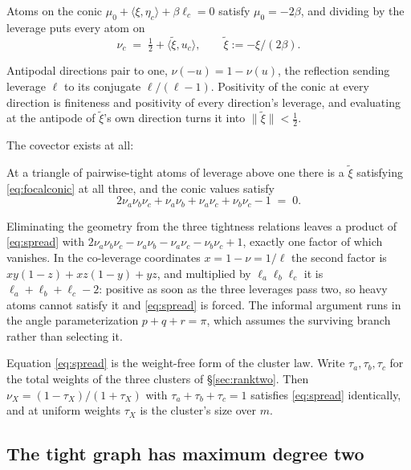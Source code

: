 \begin{proposition}[Lean]\label{prop:focalconic}
Atoms on the conic $\mu_0+\langle\xi,\eta_c\rangle+\beta\ell_c=0$ satisfy
$\mu_0=-2\beta$, and dividing by the leverage puts every atom on
\begin{equation}\label{eq:focalconic}
  \nu_c\;=\;\tfrac12+\langle\tilde\xi,u_c\rangle ,
  \qquad \tilde\xi:=-\xi/(2\beta) .
\end{equation}
\end{proposition}

Antipodal directions pair to one, $\nu(-u)=1-\nu(u)$, the reflection
sending leverage $\ell$ to its conjugate $\ell/(\ell-1)$.  Positivity of
the conic at every direction is finiteness and positivity of every
direction's leverage, and evaluating at the antipode of $\tilde\xi$'s own
direction turns it into $\lVert\tilde\xi\rVert<\tfrac12$.

The covector exists at all:

\begin{proposition}[Lean]\label{prop:momentcovector}
At a triangle of pairwise-tight atoms of leverage above one there is a
$\tilde\xi$ satisfying \eqref{eq:focalconic} at all three, and the conic
values satisfy
\begin{equation}\label{eq:spread}
  2\nu_a\nu_b\nu_c+\nu_a\nu_b+\nu_a\nu_c+\nu_b\nu_c-1\;=\;0 .
\end{equation}
\end{proposition}

Eliminating the geometry from the three tightness relations leaves a
product of \eqref{eq:spread} with
$2\nu_a\nu_b\nu_c-\nu_a\nu_b-\nu_a\nu_c-\nu_b\nu_c+1$, exactly one factor
of which vanishes.  In the co-leverage coordinates $x=1-\nu=1/\ell$ the
second factor is $xy(1-z)+xz(1-y)+yz$, and multiplied by
$\ell_a\ell_b\ell_c$ it is $\ell_a+\ell_b+\ell_c-2$: positive as soon as
the three leverages pass two, so heavy atoms cannot satisfy it and
\eqref{eq:spread} is forced.  The informal argument runs in the angle
parameterization $p+q+r=\pi$, which assumes the surviving branch rather
than selecting it.

Equation \eqref{eq:spread} is the weight-free form of the cluster law.
Write $\tau_a,\tau_b,\tau_c$ for the total weights of the three clusters
of \S\ref{sec:ranktwo}.  Then $\nu_X=(1-\tau_X)/(1+\tau_X)$ with
$\tau_a+\tau_b+\tau_c=1$ satisfies \eqref{eq:spread} identically, and at
uniform weights $\tau_X$ is the cluster's size over $m$.

\subsection{The tight graph has maximum degree two}\label{app:tightgraph}

